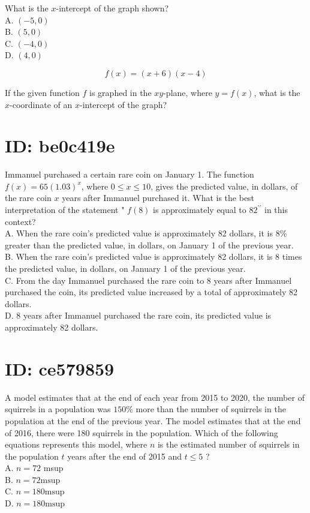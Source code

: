What is the $x$-intercept of the graph shown?\\
A. $(-5,0)$\\
B. $(5,0)$\\
C. $(-4,0)$\\
D. $(4,0)$

$$
f(x)=(x+6)(x-4)
$$

If the given function $f$ is graphed in the $x y$-plane, where $y=f(x)$, what is the $x$-coordinate of an $x$-intercept of the graph?

\section*{ID: be0c419e}
Immanuel purchased a certain rare coin on January 1. The function $f(x)=65(1.03)^{x}$, where $0 \leq x \leq 10$, gives the predicted value, in dollars, of the rare coin $x$ years after Immanuel purchased it. What is the best interpretation of the statement " $f(8)$ is approximately equal to $82^{\prime \prime}$ in this context?\\
A. When the rare coin's predicted value is approximately 82 dollars, it is $8 \%$ greater than the predicted value, in dollars, on January 1 of the previous year.\\
B. When the rare coin's predicted value is approximately 82 dollars, it is 8 times the predicted value, in dollars, on January 1 of the previous year.\\
C. From the day Immanuel purchased the rare coin to 8 years after Immanuel purchased the coin, its predicted value increased by a total of approximately 82 dollars.\\
D. 8 years after Immanuel purchased the rare coin, its predicted value is approximately 82 dollars.

\section*{ID: ce579859}
A model estimates that at the end of each year from 2015 to 2020, the number of squirrels in a population was $150 \%$ more than the number of squirrels in the population at the end of the previous year. The model estimates that at the end of 2016, there were 180 squirrels in the population. Which of the following equations represents this model, where $n$ is the estimated number of squirrels in the population $t$ years after the end of 2015 and $t \leq 5$ ?\\
A. $n=72$ msup\\
B. $n=72 \mathrm{msup}$\\
C. $n=180 \mathrm{msup}$\\
D. $n=180 \mathrm{msup}$

